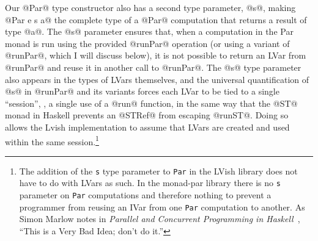 Our @Par@ type constructor also has a second type parameter, @s@,
making @Par e s a@ the complete type of a @Par@ computation that
returns a result of type @a@.  The @s@ parameter ensures that, when a
computation in the Par monad is run using the provided @runPar@
operation (or using a variant of @runPar@, which I will discuss
below), it is not possible to return an LVar from @runPar@ and reuse
it in another call to @runPar@.  The @s@ type parameter also appears
in the types of LVars themselves, and the universal quantification of
@s@ in @runPar@ and its variants forces each LVar to be tied to a
single ``session'', \ie, a single use of a @run@ function, in the same
way that the @ST@ monad in Haskell prevents an @STRef@ from escaping
@runST@.  Doing so allows the Lvish implementation to assume that
LVars are created and used within the same session.\footnote{The
  addition of the \lstinline|s| type parameter to \lstinline|Par| in
  the LVish library does not have to do with LVars as such. In the
  monad-par library there is no \lstinline|s| parameter on
  \lstinline|Par| computations and therefore nothing to prevent a
  programmer from reusing an IVar from one \lstinline|Par| computation
  to another.  As Simon Marlow notes in \emph{Parallel and Concurrent
    Programming in Haskell}~\cite{marlow-book}, ``This is a Very Bad
  Idea; don't do it.''}


